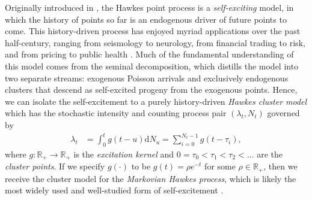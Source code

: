\documentclass[opre,nonblindrev]{informs3_no_remark}
\begin{document}
Originally introduced in \citet{hawkes1971spectra}, the Hawkes point process is a \emph{self-exciting} model, in which the history of points so far is an endogenous driver of future points to come. This history-driven process has enjoyed myriad applications over the past half-century, ranging from seismology to neurology, from financial trading to risk, and from pricing to public health \citep[e.g.,][]{bacry2015hawkes,brown2002time,liao2026tides,ogata1988statistical,xu2014path,yuan2026dynamic}. Much of the fundamental understanding of this model comes from the seminal \citet{hawkes1974cluster} decomposition, which distills the model into two separate streams: exogenous Poisson arrivals and exclusively endogenous clusters that descend as self-excited progeny from the exogenous points. Hence,  we can isolate the self-excitement to a purely history-driven \emph{Hawkes cluster model} which has the stochastic intensity and counting process pair $(\lambda_t, N_t)$ governed by
\begin{align}
\lambda_t
&=
\int_0^t g(t-u)\mathrm{d}N_u
=
\sum_{i=0}^{N_t-1}
g(t-\tau_i)
,
\label{intensityDefEq}
\end{align}
where $g : \mathbb{R}_+ \to \mathbb{R}_+$ is the \emph{excitation kernel} and $0 = \tau_0 < \tau_1 < \tau_2 < \dots$ are the \emph{cluster points}. If we specify $g(\cdot)$ to be $g(t) = \rho e^{-t}$ for some $\rho \in \mathbb{R}_+$, then we receive the cluster model for the \textit{Markovian Hawkes process}, which is likely the most widely used and well-studied form of self-excitement \citep{oakes1975markovian}. 
\end{document}
